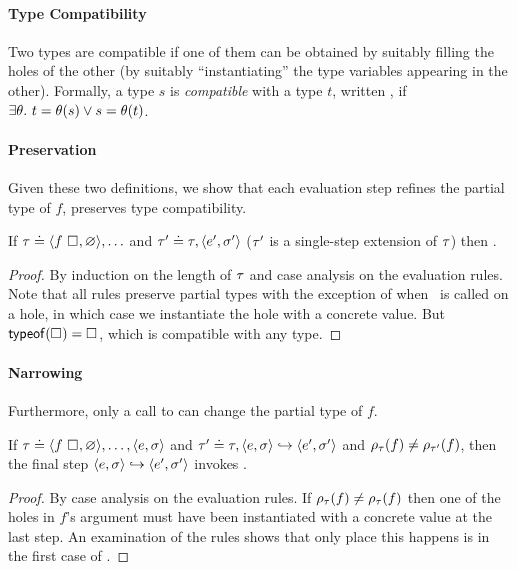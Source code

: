 \paragraph{Type Compatibility}
Two types are compatible if one of them can be obtained by
suitably filling the holes of the other (\ie by suitably ``instantiating''
the type variables appearing in the other). Formally, a type $s$ is
\emph{compatible} with a type $t$, written , if
$\exists \theta.\ t = \theta(s) \lor s = \theta(t)$.

\paragraph{Preservation}
Given these two definitions, we show that each evaluation step
refines the partial type of $f$, \ie preserves type compatibility.
%
\begin{lem}
\label{lem:refine-partial}
If $\tau \doteq \langle f \ \square_{}, \varnothing \rangle,\ldots$ and
$\tau' \doteq \tau, \langle e', \sigma' \rangle$ (\ie $\tau'$ is a single-step
extension of $\tau$)
%
%
then .
\end{lem}
\begin{proof}
  By induction on the length of $\tau$ and case analysis on the evaluation rules.
  Note that all rules preserve partial types with the exception of when
  \forcesym\ is called on a hole, in which case we instantiate the hole with
  a concrete value.
  But $\mathsf{typeof}(\square_{}) = \square_{}$, which is compatible with any type.
\end{proof}

\paragraph{Narrowing}
%
Furthermore, only a call to \forcesym can change the partial type of $f$.
%
\begin{lem}
\label{lem:force-inst}
If
$\tau \doteq \langle f \ \square_{}, \varnothing \rangle, \ldots,\langle e, \sigma \rangle$
and
$\tau' \doteq \tau, \langle e, \sigma \rangle \hookrightarrow \langle e', \sigma' \rangle$
and
$\rho_{\tau}(f) \neq \rho_{\tau'}(f)$,
then the final step $\langle e, \sigma \rangle \hookrightarrow \langle e', \sigma' \rangle$ invokes \forcesym.
\end{lem}

\begin{proof}
  By case analysis on the evaluation rules.
  If $\rho_{\tau}(f) \neq \rho_{\tau}(f)$ then one of the holes in $f$'s
  argument must have been instantiated with a concrete value at the last step.
  An examination of the rules shows that only place this happens is
  in the first case of \forcesym.
\end{proof}

